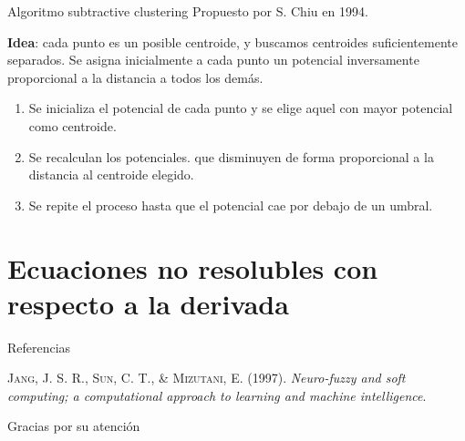 \documentclass[spanish]{beamer}
\begin{document}
\begin{frame}{Algoritmo subtractive clustering}
  Propuesto por S. Chiu en 1994.

  \textbf{Idea}: cada punto es un posible centroide, y buscamos centroides suficientemente separados. Se asigna inicialmente a cada punto un potencial inversamente proporcional a la distancia a todos los demás.

  \begin{enumerate}[<+->]
    \item Se inicializa el potencial de cada punto y se elige aquel con mayor potencial como centroide.
    \item Se recalculan los potenciales. que disminuyen de forma proporcional a la distancia al centroide elegido.
    \item Se repite el proceso hasta que el potencial cae por debajo de un umbral.
  \end{enumerate}
\end{frame}














\section{Ecuaciones no resolubles con respecto a la derivada}





\begin{frame}{Referencias}
\begin{thebibliography}{9}

  \textsc{Jang, J. S. R., Sun, C. T., \& Mizutani, E}. (1997). \textit{Neuro-fuzzy and soft computing; a computational approach to learning and machine intelligence}.

\end{thebibliography}
\end{frame}

\begin{frame}[standout]
Gracias por su atención
\end{frame}
\end{document}

